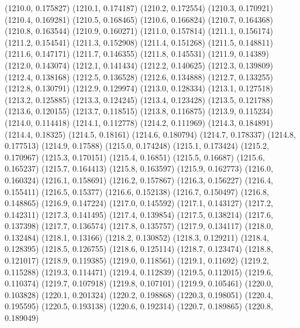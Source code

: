 {					(1210.0, 0.175827)
					(1210.1, 0.174187)
					(1210.2, 0.172554)
					(1210.3, 0.170921)
					(1210.4, 0.169281)
					(1210.5, 0.168465)
					(1210.6, 0.166824)
					(1210.7, 0.164368)
					(1210.8, 0.163544)
					(1210.9, 0.160271)
					(1211.0, 0.157814)
					(1211.1, 0.156174)
					(1211.2, 0.154541)
					(1211.3, 0.152908)
					(1211.4, 0.151268)
					(1211.5, 0.148811)
					(1211.6, 0.147171)
					(1211.7, 0.146355)
					(1211.8, 0.145531)
					(1211.9, 0.14389)
					(1212.0, 0.143074)
					(1212.1, 0.141434)
					(1212.2, 0.140625)
					(1212.3, 0.139809)
					(1212.4, 0.138168)
					(1212.5, 0.136528)
					(1212.6, 0.134888)
					(1212.7, 0.133255)
					(1212.8, 0.130791)
					(1212.9, 0.129974)
					(1213.0, 0.128334)
					(1213.1, 0.127518)
					(1213.2, 0.125885)
					(1213.3, 0.124245)
					(1213.4, 0.123428)
					(1213.5, 0.121788)
					(1213.6, 0.120155)
					(1213.7, 0.118515)
					(1213.8, 0.116875)
					(1213.9, 0.115234)
					(1214.0, 0.114418)
					(1214.1, 0.112778)
					(1214.2, 0.111969)
					(1214.3, 0.184891)
					(1214.4, 0.18325)
					(1214.5, 0.18161)
					(1214.6, 0.180794)
					(1214.7, 0.178337)
					(1214.8, 0.177513)
					(1214.9, 0.17588)
					(1215.0, 0.174248)
					(1215.1, 0.173424)
					(1215.2, 0.170967)
					(1215.3, 0.170151)
					(1215.4, 0.16851)
					(1215.5, 0.16687)
					(1215.6, 0.165237)
					(1215.7, 0.164413)
					(1215.8, 0.163597)
					(1215.9, 0.162773)
					(1216.0, 0.160324)
					(1216.1, 0.158691)
					(1216.2, 0.157867)
					(1216.3, 0.156227)
					(1216.4, 0.155411)
					(1216.5, 0.15377)
					(1216.6, 0.152138)
					(1216.7, 0.150497)
					(1216.8, 0.148865)
					(1216.9, 0.147224)
					(1217.0, 0.145592)
					(1217.1, 0.143127)
					(1217.2, 0.142311)
					(1217.3, 0.141495)
					(1217.4, 0.139854)
					(1217.5, 0.138214)
					(1217.6, 0.137398)
					(1217.7, 0.136574)
					(1217.8, 0.135757)
					(1217.9, 0.134117)
					(1218.0, 0.132484)
					(1218.1, 0.13166)
					(1218.2, 0.130852)
					(1218.3, 0.129211)
					(1218.4, 0.128395)
					(1218.5, 0.126755)
					(1218.6, 0.125114)
					(1218.7, 0.123474)
					(1218.8, 0.121017)
					(1218.9, 0.119385)
					(1219.0, 0.118561)
					(1219.1, 0.11692)
					(1219.2, 0.115288)
					(1219.3, 0.114471)
					(1219.4, 0.112839)
					(1219.5, 0.112015)
					(1219.6, 0.110374)
					(1219.7, 0.107918)
					(1219.8, 0.107101)
					(1219.9, 0.105461)
					(1220.0, 0.103828)
					(1220.1, 0.201324)
					(1220.2, 0.198868)
					(1220.3, 0.198051)
					(1220.4, 0.195595)
					(1220.5, 0.193138)
					(1220.6, 0.192314)
					(1220.7, 0.189865)
					(1220.8, 0.189049)
}
